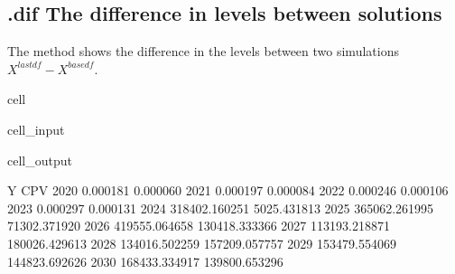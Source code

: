 \documentclass[letterpaper,10pt,english]{jupyterBook}
\begin{document}
\subsection{.dif  The difference in levels between solutions}
\label{\detokenize{content/05_SimpleModel/SimpleModel:dif-the-difference-in-levels-between-solutions}}
\sphinxAtStartPar
The  method shows the difference in the levels between two simulations  \(X^{lastdf}-X^{basedf}\).

\begin{sphinxuseclass}{cell}\begin{sphinxVerbatimInput}

\begin{sphinxuseclass}{cell_input}
\begin{sphinxVerbatim}[commandchars=\\\{\}]
\PYG{p}{[}\PYG{p}{]}

\end{sphinxVerbatim}

\end{sphinxuseclass}\end{sphinxVerbatimInput}
\begin{sphinxVerbatimOutput}

\begin{sphinxuseclass}{cell_output}
\begin{sphinxVerbatim}[commandchars=\\\{\}]
                  Y            CPV
2020       0.000181       0.000060
2021       0.000197       0.000084
2022       0.000246       0.000106
2023       0.000297       0.000131
2024  318402.160251    5025.431813
2025  365062.261995   71302.371920
2026  419555.064658  130418.333366
2027  113193.218871  180026.429613
2028  134016.502259  157209.057757
2029  153479.554069  144823.692626
2030  168433.334917  139800.653296
\end{sphinxVerbatim}

\end{sphinxuseclass}\end{sphinxVerbatimOutput}

\end{sphinxuseclass}
\end{document}
